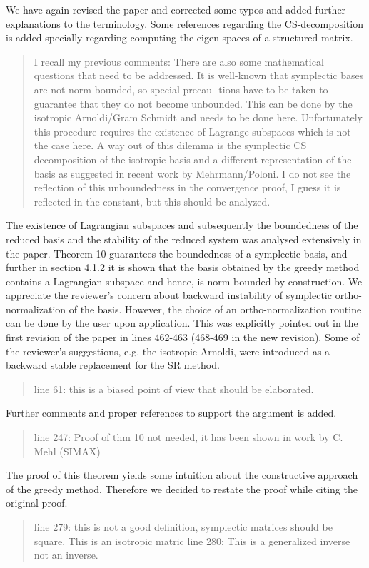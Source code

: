 \documentclass[a4paper]{article}
\newcommand{\breview}{\begin{quotation}\begin{bf}\noindent}
\newcommand{\ereview}{\end{bf}\end{quotation}}
\begin{document}
We have again revised the paper and corrected some typos and added further explanations to the terminology. Some references regarding the CS-decomposition is added specially regarding computing the eigen-spaces of a structured matrix.


\breview
I recall my previous comments: There are also some mathematical questions that need to be addressed. It is well-known that symplectic bases are not norm bounded, so special precau- tions have to be taken to guarantee that they do not become unbounded. This can be done by the isotropic Arnoldi/Gram Schmidt and needs to be done here. Unfortunately this procedure requires the existence of Lagrange subspaces which is not the case here. A way out of this dilemma is the symplectic CS decomposition of the isotropic basis and a different representation of the basis as suggested in recent work by Mehrmann/Poloni.
I do not see the reflection of this unboundedness in the convergence proof, I guess it is reflected in the constant, but this should be analyzed.
\ereview

The existence of Lagrangian subspaces and subsequently the boundedness of the reduced basis and the stability of the reduced system was analysed extensively in the paper. Theorem 10 guarantees the boundedness of a symplectic basis, and further in section 4.1.2 it is shown that the basis obtained by the greedy method contains a Lagrangian subspace and hence, is norm-bounded by construction. We appreciate the reviewer's concern about backward instability of symplectic ortho-normalization of the basis. However, the choice of an ortho-normalization routine can be done by the user upon application. This was explicitly pointed out in the first revision of the paper in lines 462-463 (468-469 in the new revision). Some of the reviewer's suggestions, e.g. the isotropic Arnoldi, were introduced as a backward stable replacement for the SR method.

\breview
line 61: this is a biased point of view that should be elaborated.
\ereview

Further comments and proper references to support the argument is added. 

\breview
line 247: Proof of thm 10 not needed, it has been shown in work by C. Mehl (SIMAX)
\ereview

The proof of this theorem yields some intuition about the constructive approach of the greedy method. Therefore we decided to restate the proof while citing the original proof.

\breview
line 279: this is not a good definition, symplectic matrices should be square. This is an isotropic matric
line 280: This is a generalized inverse not an inverse.
\ereview
\end{document}
